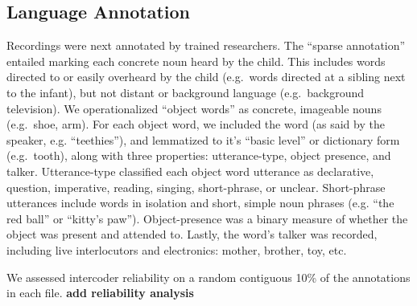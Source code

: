 \documentclass[floatsintext,man]{apa6}
\theoremstyle{definition}
\theoremstyle{definition}
\theoremstyle{definition}
\theoremstyle{remark}
\begin{document}
\subsection{Language Annotation}\label{language-annotation}

Recordings were next annotated by trained researchers. The
\enquote{sparse annotation} entailed marking each concrete noun heard by
the child. This includes words directed to or easily overheard by the
child (e.g.~words directed at a sibling next to the infant), but not
distant or background language (e.g.~background television). We
operationalized \enquote{object words} as concrete, imageable nouns
(e.g.~shoe, arm). For each object word, we included the word (as said by
the speaker, e.g. \enquote{teethies}), and lemmatized to it's
\enquote{basic level} or dictionary form (e.g.~tooth), along with three
properties: utterance-type, object presence, and talker. Utterance-type
classified each object word utterance as declarative, question,
imperative, reading, singing, short-phrase, or unclear. Short-phrase
utterances include words in isolation and short, simple noun phrases
(e.g. \enquote{the red ball} or \enquote{kitty's paw}). Object-presence
was a binary measure of whether the object was present and attended to.
Lastly, the word's talker was recorded, including live interlocutors and
electronics: mother, brother, toy, etc.

We assessed intercoder reliability on a random contiguous 10\% of the
annotations in each file. \textbf{add reliability analysis}
\end{document}
